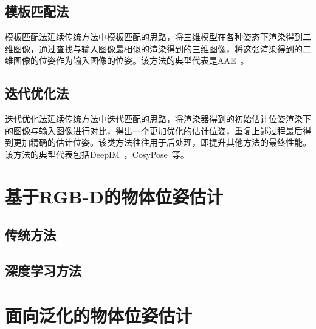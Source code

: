 \subsection{模板匹配法}
\par 模板匹配法延续传统方法中模板匹配的思路，将三维模型在各种姿态下渲染得到二维图像，通过查找与输入图像最相似的渲染得到的三维图像，将这张渲染得到的二维图像的位姿作为输入图像的位姿。该方法的典型代表是AAE~\cite{sundermeyer2018implicit}。
\subsection{迭代优化法}
\par 迭代优化法延续传统方法中迭代匹配的思路，将渲染器得到的初始估计位姿渲染下的图像与输入图像进行对比，得出一个更加优化的估计位姿，重复上述过程最后得到更加精确的估计位姿。该类方法往往用于后处理，即提升其他方法的最终性能。该方法的典型代表包括DeepIM~\cite{li2018deepim}，CosyPose~\cite{labbe2020cosypose}等。
\section{基于RGB-D的物体位姿估计}
\subsection{传统方法}
\subsection{深度学习方法}
\section{面向泛化的物体位姿估计}


